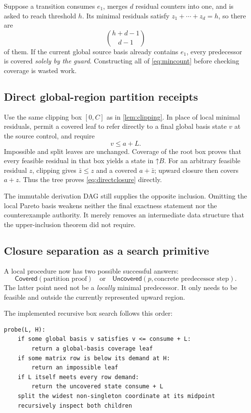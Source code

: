 \documentclass[11pt,a4paper]{article}
\theoremstyle{definition}
\newcommand{\Up}[1]{\mathord{\uparrow}#1}
\begin{document}
Suppose a transition consumes $e_1$, merges $d$ residual counters into one,
and is asked to reach threshold $h$. Its minimal residuals satisfy
$z_1+\cdots+z_d=h$, so there are
\begin{equation}
 \binom{h+d-1}{d-1}
 \label{eq:mincount}
\end{equation}
of them. If the current global source basis already contains $e_1$, every
predecessor is covered \emph{solely by the guard}. Constructing all of
\eqref{eq:mincount} before checking coverage is wasted work.

\subsection{Direct global-region partition receipts}
Use the same clipping box $[0,C]$ as in \cref{lem:clipping}. In place of local
minimal residuals, permit a covered leaf to refer directly to a final global
basis state $v$ at the source control, and require
\begin{equation}
 v\leq a+L.
 \label{eq:globalleaf}
\end{equation}
Impossible and split leaves are unchanged. Coverage of the root box proves
that every feasible residual in that box yields a state in $\Up B$.
For an arbitrary feasible residual $z$, clipping gives
$\bar z\leq z$ and a covered $a+\bar z$; upward closure then covers $a+z$.
Thus the tree proves \eqref{eq:directclosure} directly.

The immutable derivation DAG still supplies the opposite inclusion. Omitting
the local Pareto basis weakens neither the final exactness statement nor the
counterexample authority. It merely removes an intermediate data structure
that the upper-inclusion theorem did not require.

\subsection{Closure separation as a search primitive}
A local procedure now has two possible successful answers:
\begin{equation}
 \mathsf{Covered}(\text{partition proof})
 \quad\text{or}\quad
 \mathsf{Uncovered}(p,\text{concrete predecessor step}).
 \label{eq:separation}
\end{equation}
The latter point need not be a \emph{locally} minimal predecessor. It only
needs to be feasible and outside the currently represented upward region.

The implemented recursive box search follows this order:
\begin{lstlisting}
probe(L, H):
    if some global basis v satisfies v <= consume + L:
        return a global-basis coverage leaf
    if some matrix row is below its demand at H:
        return an impossible leaf
    if L itself meets every row demand:
        return the uncovered state consume + L
    split the widest non-singleton coordinate at its midpoint
    recursively inspect both children
\end{lstlisting}
\end{document}
